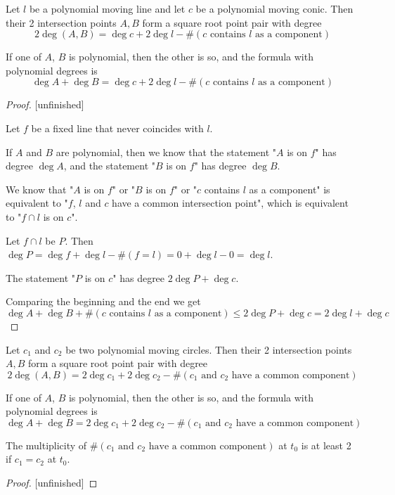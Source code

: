 \documentclass[a4paper]{article}
\begin{document}
\begin{theorem}
    Let $l$ be a polynomial moving line and let $c$ be a polynomial moving conic. Then their 2 intersection points $A,B$ form a square root point pair with degree
    $$2\deg (A,B)= \deg c + 2\deg l-\#(\text{$c$ contains $l$ as a component})$$
\end{theorem}
\begin{remark}
    If one of $A$, $B$ is polynomial, then the other is so, and the formula with polynomial degrees is
    $$\deg A+\deg B= \deg c + 2\deg l-\#(\text{$c$ contains $l$ as a component})$$
\end{remark}
\begin{proof}

[unfinished]

    Let $f$ be a fixed line that never coincides with $l$.

    If $A$ and $B$ are polynomial, then we know that the statement "$A$ is on $f$" has degree $\deg A$, and the statement "$B$ is on $f$" has degree $\deg B$.

    We know that "$A$ is on $f$" or "$B$ is on $f$" or "$c$ contains $l$ as a component" is equivalent to "$f$, $l$ and $c$ have a common intersection point", which is equivalent to "$f\cap l$ is on $c$".

    Let $f\cap l$ be $P$. Then $\deg P=\deg f+\deg l-\#(f=l)=0+\deg l-0=\deg l$.

    The statement "$P$ is on $c$" has degree $2\deg P +\deg c$.

    Comparing the beginning and the end we get
    $$\deg A+\deg B+\#(\text{$c$ contains $l$ as a component})\le2\deg P +\deg c=2\deg l +\deg c$$
\end{proof}

\begin{theorem}
    Let $c_1$ and $c_2$ be two polynomial moving circles. Then their 2 intersection points $A,B$ form a square root point pair with degree
    $$2\deg (A,B)=2\deg c_1 + 2\deg c_2-\#(\text{$c_1$ and $c_2$ have a common component})$$
\end{theorem}
\begin{remark}
    If one of $A$, $B$ is polynomial, then the other is so, and the formula with polynomial degrees is
    $$\deg A+\deg B= 2\deg c_1 + 2\deg c_2-\#(\text{$c_1$ and $c_2$ have a common component})$$
\end{remark}
\begin{remark}
    The multiplicity of $\#(\text{$c_1$ and $c_2$ have a common component})$ at $t_0$ is at least 2 if $c_1=c_2$ at $t_0$.
\end{remark}
\begin{proof}

    [unfinished]
\end{proof}
\end{document}
